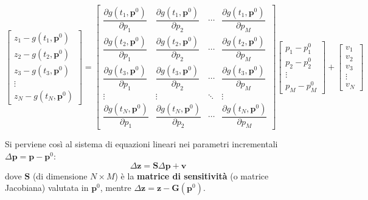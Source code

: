 \begin{equation}
\begin{bmatrix}
z_{1} - g(t_{1}, \mathbf{p}^{0}) \\
z_{2} - g(t_{2}, \mathbf{p}^{0}) \\
z_{3} - g(t_{3}, \mathbf{p}^{0}) \\
\vdots \\
z_{N} - g(t_{N}, \mathbf{p}^{0})
\end{bmatrix}
=
\begin{bmatrix}
\dfrac{\partial g(t_{1}, \mathbf{p}^{0})}{\partial p_{1}} & \dfrac{\partial g(t_{1}, \mathbf{p}^{0})}{\partial p_{2}} & \cdots & \dfrac{\partial g(t_{1}, \mathbf{p}^{0})}{\partial p_{M}} \\[2.2ex]
\dfrac{\partial g(t_{2}, \mathbf{p}^{0})}{\partial p_{1}} & \dfrac{\partial g(t_{2}, \mathbf{p}^{0})}{\partial p_{2}} & \cdots & \dfrac{\partial g(t_{2}, \mathbf{p}^{0})}{\partial p_{M}} \\[2.2ex]
\dfrac{\partial g(t_{3}, \mathbf{p}^{0})}{\partial p_{1}} & \dfrac{\partial g(t_{3}, \mathbf{p}^{0})}{\partial p_{2}} & \cdots & \dfrac{\partial g(t_{3}, \mathbf{p}^{0})}{\partial p_{M}} \\[1.5ex]
\vdots & \vdots & \ddots & \vdots \\[1.5ex]
\dfrac{\partial g(t_{N}, \mathbf{p}^{0})}{\partial p_{1}} & \dfrac{\partial g(t_{N}, \mathbf{p}^{0})}{\partial p_{2}} & \cdots & \dfrac{\partial g(t_{N}, \mathbf{p}^{0})}{\partial p_{M}}
\end{bmatrix}
\begin{bmatrix}
p_{1} - p_{1}^{0} \\
p_{2} - p_{2}^{0} \\
\vdots \\
p_{M} - p_{M}^{0}
\end{bmatrix}
+
\begin{bmatrix}
v_{1} \\
v_{2} \\
v_{3} \\
\vdots \\
v_{N}
\end{bmatrix}
\end{equation}

Si perviene così al sistema di equazioni lineari nei parametri incrementali $\Delta\mathbf{p} = \mathbf{p} - \mathbf{p}^{0}$:
\begin{equation}
\Delta\mathbf{z} = \mathbf{S}\Delta\mathbf{p} + \mathbf{v}
\end{equation}
dove $\mathbf{S}$ (di dimensione $N \times M$) è la \textbf{matrice di sensitività} (o matrice Jacobiana) valutata in $\mathbf{p}^{0}$, mentre $\Delta\mathbf{z} = \mathbf{z} - \mathbf{G}(\mathbf{p}^{0})$.

